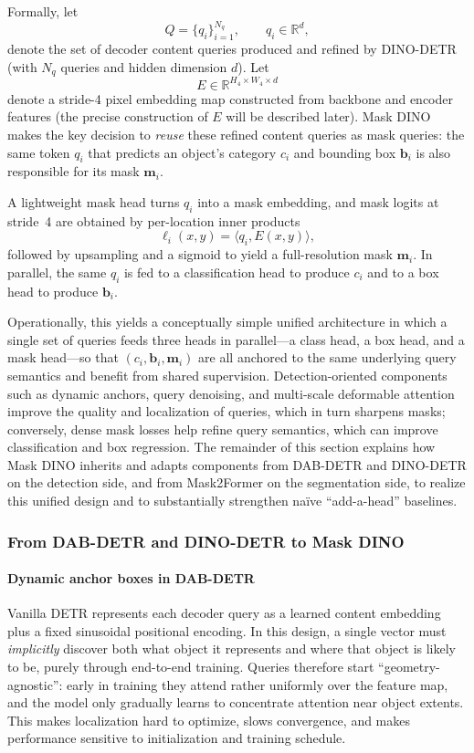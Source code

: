 \begin{enrichment}
\begin{enrichment}
		Formally, let
		\[
		Q = \{q_i\}_{i=1}^{N_q}, \qquad q_i \in \mathbb{R}^d,
		\]
		denote the set of decoder content queries produced and refined by DINO-DETR (with $N_q$ queries and hidden dimension $d$). Let
		\[
		E \in \mathbb{R}^{H_4 \times W_4 \times d}
		\]
		denote a stride-4 pixel embedding map constructed from backbone and encoder features (the precise construction of $E$ will be described later). Mask DINO makes the key decision to \emph{reuse} these refined content queries as mask queries: the same token $q_i$ that predicts an object's category $c_i$ and bounding box $\mathbf{b}_i$ is also responsible for its mask $\mathbf{m}_i$.
		
		A lightweight mask head turns $q_i$ into a mask embedding, and mask logits at stride~4 are obtained by per-location inner products
		\[
		\ell_i(x,y) = \langle q_i, E(x,y) \rangle,
		\]
		followed by upsampling and a sigmoid to yield a full-resolution mask $\mathbf{m}_i$. In parallel, the same $q_i$ is fed to a classification head to produce $c_i$ and to a box head to produce $\mathbf{b}_i$.
		
		Operationally, this yields a conceptually simple unified architecture in which a single set of queries feeds three heads in parallel---a class head, a box head, and a mask head---so that $(c_i,\mathbf{b}_i,\mathbf{m}_i)$ are all anchored to the same underlying query semantics and benefit from shared supervision. Detection-oriented components such as dynamic anchors, query denoising, and multi-scale deformable attention improve the quality and localization of queries, which in turn sharpens masks; conversely, dense mask losses help refine query semantics, which can improve classification and box regression. The remainder of this section explains how Mask DINO inherits and adapts components from DAB-DETR and DINO-DETR on the detection side, and from Mask2Former on the segmentation side, to realize this unified design and to substantially strengthen naïve ``add-a-head'' baselines.
		
		\subsubsection{From DAB-DETR and DINO-DETR to Mask DINO}
		
		\paragraph{Dynamic anchor boxes in DAB-DETR}
		Vanilla DETR represents each decoder query as a learned content embedding plus a fixed sinusoidal positional encoding. In this design, a single vector must \emph{implicitly} discover both what object it represents and where that object is likely to be, purely through end-to-end training. Queries therefore start ``geometry-agnostic'': early in training they attend rather uniformly over the feature map, and the model only gradually learns to concentrate attention near object extents. This makes localization hard to optimize, slows convergence, and makes performance sensitive to initialization and training schedule.
		

\end{enrichment}
\end{enrichment}
